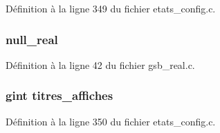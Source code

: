 Définition à la ligne 349 du fichier etats\_\-config.c.

\subsubsection[{null\_\-real}]{ {\bf null\_\-real}}\label{etats__affiche_8c_a26f304bec3fdc0651b9aa8765d4de3c6}


Définition à la ligne 42 du fichier gsb\_\-real.c.

\subsubsection[{titres\_\-affiches}]{\setlength{\rightskip}{0pt plus 5cm}gint {\bf titres\_\-affiches}}\label{etats__affiche_8c_aa74984417afb965dc68f02651313074b}


Définition à la ligne 350 du fichier etats\_\-config.c.

